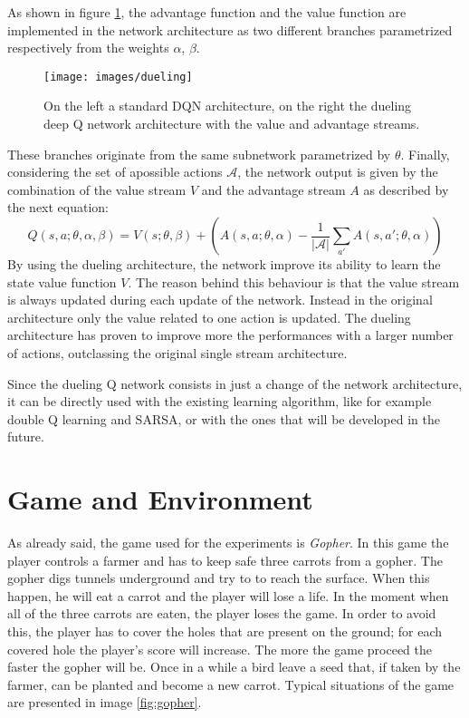 \documentclass[article,11pt]{article}
\begin{document}
	As shown in figure \ref{fig:dueling}, the advantage function and the value function are implemented in the network architecture as two different branches parametrized respectively from the weights $\alpha$, $\beta$.
	\begin{figure}
		\centering
		\texttt{[image: images/dueling]}
		\caption{On the left a standard DQN architecture, on the right the dueling deep Q network architecture with the value and advantage streams. }
		\label{fig:dueling}
	\end{figure}
	These branches originate from the same subnetwork parametrized by $\theta$.	Finally, considering the set of apossible actions $\mathcal{A}$, the network output is given by the combination of the value stream $V$ and the advantage stream $A$ as described by the next equation:
	\begin{equation}
		\label{eq:dueling}
		Q(s, a; \theta, \alpha, \beta) = V(s;\theta, \beta) + \left( A(s,a;\theta,\alpha) - \dfrac{1}{|\mathcal{A}|} \sum_{a'}^{} A(s, a'; \theta,\alpha) \right)
	\end{equation}
	By using the dueling architecture, the network improve its ability to learn the state value function $V$. The reason behind this behaviour is that the value stream is always updated during each update of the network. Instead in the original architecture only the value related to one action is updated. The dueling architecture has proven to improve more the performances with a larger number of actions, outclassing the original single stream architecture.
	
	Since the dueling Q network consists in just a change of the network architecture, it can be directly used with the existing learning algorithm, like for example double Q learning and SARSA, or with the ones that will be developed in the future.
	
	\section{Game and Environment}
	As already said, the game used for the experiments is \textit{Gopher}. In this game the player controls a farmer and has to keep safe three carrots from a gopher. The gopher digs tunnels underground and try to to reach the surface. When this happen, he will eat a carrot and the player will lose a life. In the moment when all of the three carrots are eaten, the player loses the game. In order to avoid this, the player has to cover the holes that are present on the ground; for each covered hole the player's score will increase. The more the game proceed the faster the gopher will be. Once in a while a bird leave a seed that, if taken by the farmer, can be planted and become a new carrot. Typical situations of the game are presented in image \ref{fig:gopher}.
	
\end{document}
